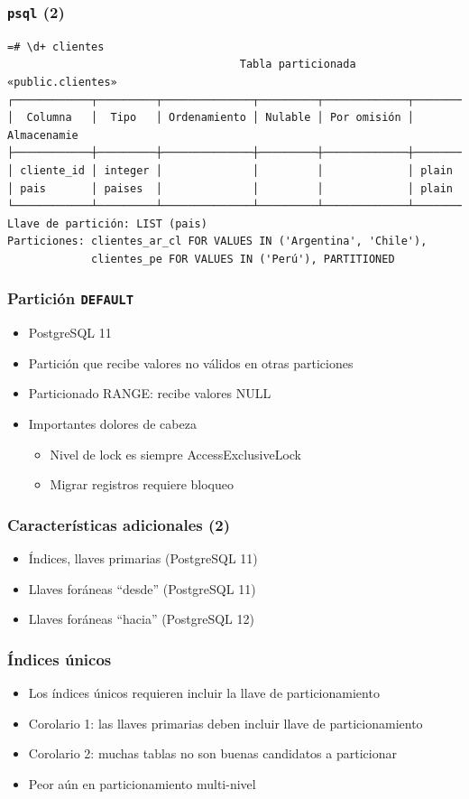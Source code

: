 \documentclass[ignorenonframetext,t]{beamer}
\begin{document}
\begin{frame}[fragile]
	\frametitle{\texttt{psql} (2)}

	\small
\begin{verbatim}
=# \d+ clientes
                                    Tabla particionada «public.clientes»
┌────────────┬─────────┬──────────────┬─────────┬─────────────┬────────────
│  Columna   │  Tipo   │ Ordenamiento │ Nulable │ Por omisión │ Almacenamie
├────────────┼─────────┼──────────────┼─────────┼─────────────┼────────────
│ cliente_id │ integer │              │         │             │ plain      
│ pais       │ paises  │              │         │             │ plain      
└────────────┴─────────┴──────────────┴─────────┴─────────────┴────────────
Llave de partición: LIST (pais)
Particiones: clientes_ar_cl FOR VALUES IN ('Argentina', 'Chile'),
             clientes_pe FOR VALUES IN ('Perú'), PARTITIONED
\end{verbatim}
\end{frame}

\begin{frame}
	\frametitle{Partición \texttt{DEFAULT}}
\begin{itemize}
	\item PostgreSQL 11
	\item Partición que recibe valores no válidos en otras particiones
	\item Particionado RANGE: recibe valores NULL
	\pause
	\item Importantes dolores de cabeza
		\begin{itemize}
			\item Nivel de lock es siempre AccessExclusiveLock
			\item Migrar registros requiere bloqueo
		\end{itemize}
\end{itemize}
\end{frame}

\begin{frame}
	\frametitle{Características adicionales (2)}
	\begin{itemize}
		\item Índices, llaves primarias (PostgreSQL 11)
		\item Llaves foráneas ``desde'' (PostgreSQL 11)
		\item Llaves foráneas ``hacia'' (PostgreSQL 12)
	\end{itemize}
\end{frame}

\begin{frame}
	\frametitle{Índices únicos}
	\begin{itemize}
		\item Los índices únicos requieren incluir la llave de particionamiento
			\pause
		\item Corolario 1: las llaves primarias deben incluir llave de particionamiento
			\pause
		\item Corolario 2: muchas tablas no son buenas candidatos a particionar
			\pause
		\item Peor aún en particionamiento multi-nivel
	\end{itemize}
\end{frame}
\end{document}
